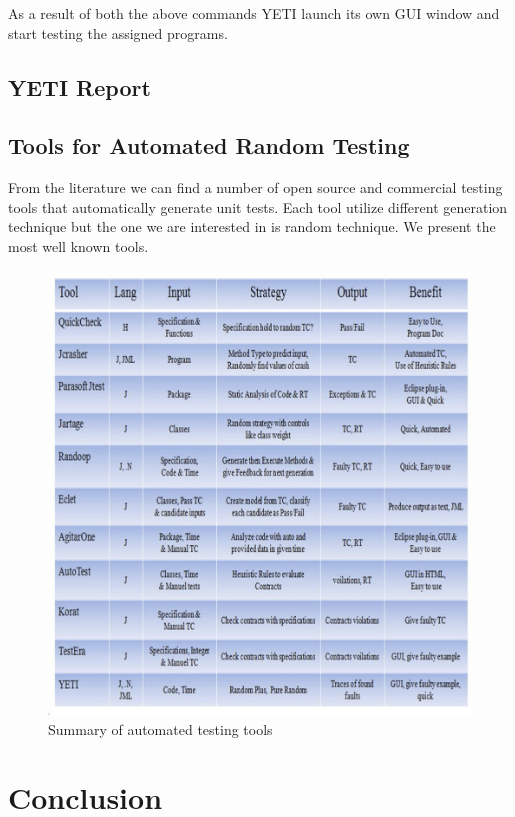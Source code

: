 As a result of both the above commands YETI launch its own GUI window and start testing the assigned programs. 




\subsection{YETI Report}



\subsection{Tools for Automated Random Testing}
From the literature we can find a number of open source and commercial testing tools that automatically generate unit tests. Each tool utilize different generation technique but the one we are interested in is random technique. We present the most well known tools.

\begin{figure}[h]
	\centering
	\includegraphics[scale=0.6]{Literature/tools}
	\caption{Summary of automated testing tools}
\end{figure}


\section{Conclusion}




